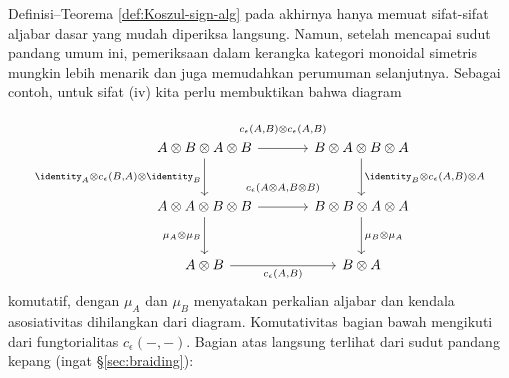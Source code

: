 Definisi--Teorema \ref{def:Koszul-sign-alg} pada akhirnya hanya memuat sifat-sifat aljabar dasar yang mudah diperiksa langsung. Namun, setelah mencapai sudut pandang umum ini, pemeriksaan dalam kerangka kategori monoidal simetris mungkin lebih menarik dan juga memudahkan perumuman selanjutnya. Sebagai contoh, untuk sifat (iv) kita perlu membuktikan bahwa diagram
\[\begin{tikzcd}[column sep=large, row sep=large]
	A \otimes B \otimes A \otimes B \arrow[r, "{c_\epsilon(A,B) \otimes c_\epsilon(A,B)}" inner sep=1em] \arrow[d, "{\identity_A \otimes c_\epsilon(B,A) \otimes \identity_B}"'] & B \otimes A \otimes B \otimes A \arrow[d, "{\identity_B \otimes c_\epsilon(A,B) \otimes A}"] \\
	A \otimes A \otimes B \otimes B \arrow[r, "{c_\epsilon(A \otimes A, B \otimes B)}" inner sep=1em] \arrow[d, "{\mu_A \otimes \mu_B}"'] &  B \otimes B \otimes A \otimes A \arrow[d, "{\mu_B \otimes \mu_A}"] \\
	A \otimes B \arrow[r, "{c_\epsilon(A,B)}"'] & B \otimes A
\end{tikzcd}\]
komutatif, dengan $\mu_A$ dan $\mu_B$ menyatakan perkalian aljabar dan kendala asosiativitas dihilangkan dari diagram. Komutativitas bagian bawah mengikuti dari fungtorialitas $c_\epsilon(-,-)$. Bagian atas langsung terlihat dari sudut pandang kepang (ingat \S\ref{sec:braiding}):
